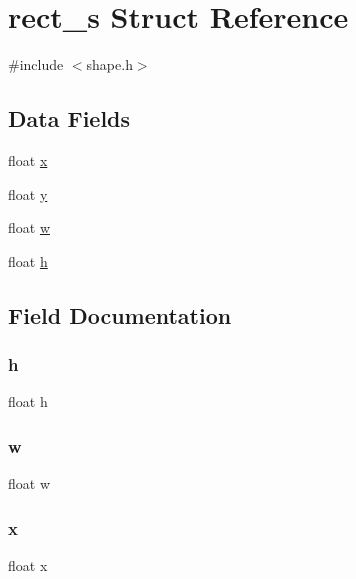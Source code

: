 \hypertarget{structrect__s}{}\section{rect\+\_\+s Struct Reference}
\label{structrect__s}


{\ttfamily \#include $<$shape.\+h$>$}

\subsection*{Data Fields}
\begin{DoxyCompactItemize}
\item 
float \hyperlink{structrect__s_ad0da36b2558901e21e7a30f6c227a45e}{x}
\item 
float \hyperlink{structrect__s_aa4f0d3eebc3c443f9be81bf48561a217}{y}
\item 
float \hyperlink{structrect__s_a56eca241e2896b9f57a79589e76fd24b}{w}
\item 
float \hyperlink{structrect__s_a85f2f1bd58b3b44ffdf3881823393959}{h}
\end{DoxyCompactItemize}


\subsection{Field Documentation}
\mbox{\label{structrect__s_a85f2f1bd58b3b44ffdf3881823393959}} 
\subsubsection{\texorpdfstring{h}{h}}
{\footnotesize\ttfamily float h}

\mbox{\label{structrect__s_a56eca241e2896b9f57a79589e76fd24b}} 
\subsubsection{\texorpdfstring{w}{w}}
{\footnotesize\ttfamily float w}

\mbox{\label{structrect__s_ad0da36b2558901e21e7a30f6c227a45e}} 
\subsubsection{\texorpdfstring{x}{x}}
{\footnotesize\ttfamily float x}

